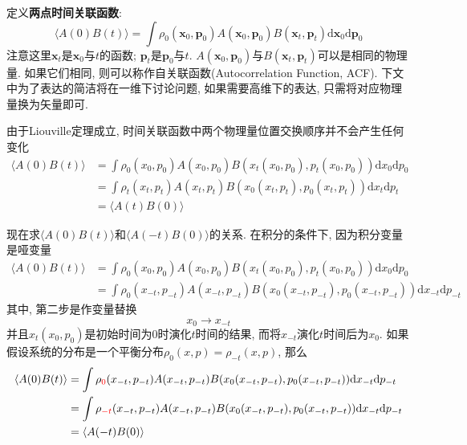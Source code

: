     \splitline

    定义\textbf{两点时间关联函数}:
    \begin{equation}
        \langle A(0)B(t) \rangle = \int \rho_0(\bm{x}_0,\bm{p}_0) A(\bm{x}_0,\bm{p}_0) B(\bm{x}_t,\bm{p}_t) \mathrm{d}\bm{x}_0 \mathrm{d}\bm{p}_0
    \end{equation}
    注意这里$\bm{x}_t$是$\bm{x}_0$与$t$的函数; $\bm{p}_t$是$\bm{p}_0$与$t$. $A(\bm{x}_0,\bm{p}_0)$与$B(\bm{x}_t,\bm{p}_t)$可以是相同的物理量. 如果它们相同, 则可以称作自关联函数(Autocorrelation Function, ACF). 下文中为了表达的简洁将在一维下讨论问题, 如果需要高维下的表达, 只需将对应物理量换为矢量即可.

    由于Liouville定理成立, 时间关联函数中两个物理量位置交换顺序并不会产生任何变化
    \begin{equation}\begin{aligned}
        \langle A(0)B(t) \rangle &= \int \rho_0(x_0,p_0) A(x_0,p_0) B(x_t(x_0,p_0),p_t(x_0,p_0)) \mathrm{d}x_0 \mathrm{d}p_0\\
        &= \int \rho_t(x_t,p_t) A(x_t,p_t) B(x_0(x_t,p_t),p_0(x_t,p_t)) \mathrm{d}x_t \mathrm{d}p_t\\
        &= \langle A(t)B(0) \rangle
    \end{aligned}\end{equation}

    现在求$\langle A(0)B(t) \rangle$和$\langle A(-t)B(0) \rangle$的关系. 在积分的条件下, 因为积分变量是哑变量
    \begin{equation}\begin{aligned}
        \langle A(0)B(t) \rangle &= \int \rho_0(x_0,p_0) A(x_0,p_0) B(x_t(x_0,p_0),p_t(x_0,p_0)) \mathrm{d}x_0 \mathrm{d}p_0\\
        &= \int \rho_0 (x_{-t},p_{-t}) A(x_{-t},p_{-t}) B(x_0(x_{-t},p_{-t}),p_0(x_{-t},p_{-t})) \mathrm{d}x_{-t} \mathrm{d}p_{-t}
    \end{aligned}\end{equation}
    其中, 第二步是作变量替换
    \begin{equation}
        x_0 \to x_{-t}
    \end{equation}
    并且$x_t(x_0,p_0)$是初始时间为0时演化$t$时间的结果, 而将$x_{-t}$演化$t$时间后为$x_0$. 如果假设系统的分布是一个平衡分布$\rho_0(x,p) = \rho_{-t}(x, p)$, 那么
    \begin{equation}\begin{aligned}
        \langle A(0)B(t) \rangle &= \int \rho_{\color{red}{0}}(x_{-t},p_{-t}) A(x_{-t},p_{-t}) B(x_0(x_{-t},p_{-t}),p_0(x_{-t},p_{-t})) \mathrm{d}x_{-t} \mathrm{d}p_{-t}\\
        &= \int \rho_{\color{red}{-t}}(x_{-t},p_{-t}) A(x_{-t},p_{-t}) B(x_0(x_{-t},p_{-t}),p_0(x_{-t},p_{-t})) \mathrm{d}x_{-t} \mathrm{d}p_{-t}\\
        &= \langle A(-t)B(0) \rangle
    \end{aligned}\end{equation}

